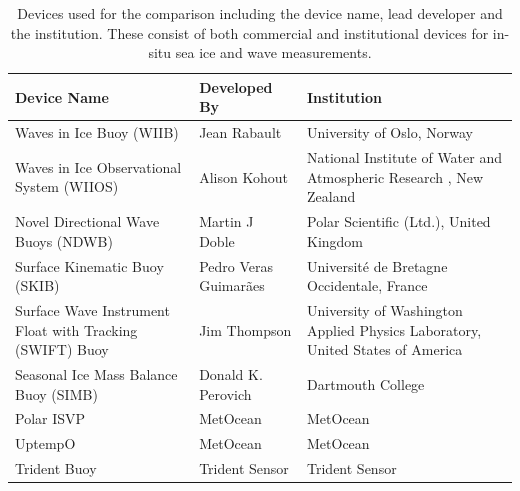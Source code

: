 \begin{center}{\setlength{\extrarowheight}{5pt}%
    \begin{longtable}[H]{|>{\RaggedRight}m{}|>{\RaggedRight}m{}| >{\RaggedRight}m{}|}
    \caption{Devices used for the comparison including the device name, lead developer and the institution. These consist of both commercial and institutional devices for in-situ sea ice and wave measurements.}\\
    \hline
    \label{tab:device_list}
    \textbf{Device Name} & \textbf{Developed By} & \textbf{Institution}\\
    \hline
    Waves in Ice Buoy (WIIB) & Jean Rabault & University of Oslo, Norway \cite{rabault2019open} \\
    \hline
    Waves in Ice Observational System (WIIOS) & Alison Kohout & National Institute of Water and Atmospheric Research \cite{kohout2015device}, New Zealand \\
    \hline
    Novel Directional Wave Buoys (NDWB) & Martin J Doble &  Polar Scientific (Ltd.), United Kingdom \cite{doble2017robust}\\
    \hline
    Surface Kinematic Buoy (SKIB) & Pedro Veras Guimarães & Université de Bretagne Occidentale, France \cite{guimaraes2018surface} \\
    \hline
    Surface Wave Instrument Float with Tracking (SWIFT) Buoy & Jim Thompson & University of Washington Applied Physics Laboratory, United States of America \cite{thomson2012wave}\\
    \hline
    Seasonal Ice Mass Balance Buoy (SIMB) & Donald K. Perovich & Dartmouth College \\
    \hline
    Polar ISVP & MetOcean & MetOcean \\
    \hline
     UptempO & MetOcean & MetOcean \\
    \hline
    Trident Buoy & Trident Sensor & Trident Sensor \\
    \hline
    \end{longtable}
}
\end{center}



